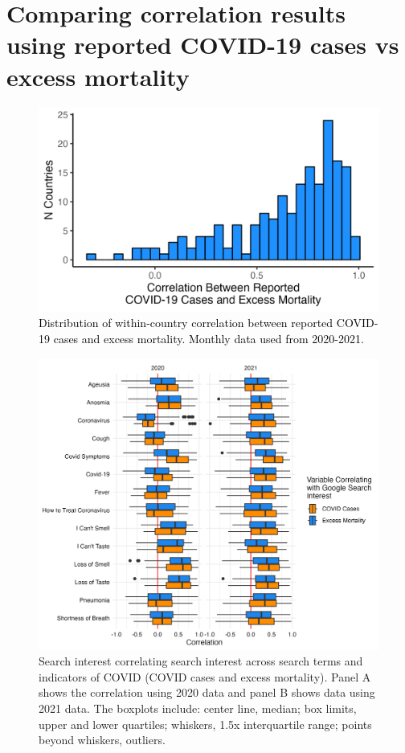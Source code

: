 \documentclass{article}
\begin{document}
\newpage
\section{Comparing correlation results using reported COVID-19 cases vs excess mortality}
\label{si:cor_cases_vs_excess}

\begin{figure}[H]
    \includegraphics[width=1\textwidth]{figures/cor_cases_excess.png}
    \caption{\textcolor{black}{Distribution of within-country correlation between reported COVID-19 cases and excess mortality. Monthly data used from 2020-2021.}}
    \label{fig:cor_cases_excess}
\end{figure}

\begin{figure}[H]
    \includegraphics[width=1\textwidth]{figures/cases_excess_boxplot.png}
    \caption{Search interest correlating search interest across search terms and indicators of COVID (COVID cases and excess mortality). Panel A shows the correlation using 2020 data and panel B shows data using 2021 data. The boxplots include: center line, median; box limits, upper and lower quartiles; whiskers, 1.5x interquartile range; points beyond whiskers, outliers.}
    \label{fig:cases_excess_boxplot}
\end{figure}
\end{document}
